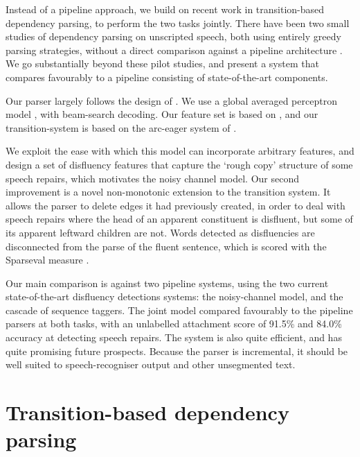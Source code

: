 \documentclass[11pt,letterpaper]{article}
\begin{document}
Instead of a pipeline approach, we build on recent work in transition-based dependency
parsing, to perform the two tasks jointly.
There have been two small studies of dependency parsing on unscripted speech,
both using entirely greedy parsing strategies, without a direct comparison
against a pipeline architecture \citep{jorgensen:07,rasooli:13}.  We go substantially
beyond these pilot studies, and present a system that compares favourably to a
pipeline consisting of state-of-the-art components.

Our parser largely follows the design of \citet{zhang:cl11}. We use a global averaged
perceptron model \citep{collins:02}, with beam-search decoding. Our feature set
is based on \citet{zhang:cl11}, and our transition-system is based on the arc-eager
system of \citet{nivre:03}.

We exploit the ease with which this model can incorporate arbitrary features,
and design a set of disfluency features that capture the
`rough copy' structure of some speech repairs, which motivates the
\citet{Johnson04a} noisy channel model.
Our second improvement is a novel non-monotonic extension to the transition
system. It allows the parser to delete edges it had previously created, in order
to deal with speech repairs where the head of an apparent constituent is disfluent,
but some of its apparent leftward children are not.  Words detected as
disfluencies are disconnected from the parse of the fluent sentence,
which is scored with the Sparseval measure \citep{sparseval}.

Our main comparison is against two pipeline systems, using the two current 
state-of-the-art disfluency detections systems: the \citet{Johnson04a} noisy-channel
model, and the \citet{qian:13} cascade of sequence taggers.  The joint model
compared favourably to the pipeline parsers at both tasks, with an unlabelled
attachment score of 91.5\% and 84.0\% accuracy at detecting speech repairs.
The system is also quite efficient, and has quite promising future prospects.
Because the parser is incremental, it should be well suited
to speech-recogniser output and other unsegmented text.

\section{Transition-based dependency parsing}
\end{document}
